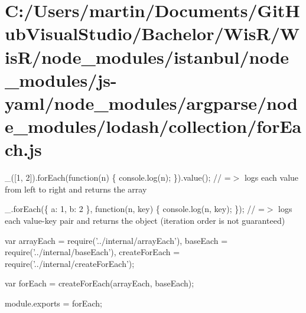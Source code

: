 \hypertarget{_c_1_2_users_2martin_2_documents_2_git_hub_visual_studio_2_bachelor_2_wis_r_2_wis_r_2node_moduleffaeb34ec877ee6de115b4c8ca4b5493}{}\section{C\+:/\+Users/martin/\+Documents/\+Git\+Hub\+Visual\+Studio/\+Bachelor/\+Wis\+R/\+Wis\+R/node\+\_\+modules/istanbul/node\+\_\+modules/js-\/yaml/node\+\_\+modules/argparse/node\+\_\+modules/lodash/collection/for\+Each.\+js}
\+\_\+(\mbox{[}1, 2\mbox{]}).for\+Each(function(n) \{ console.\+log(n); \}).value(); // =$>$ logs each value from left to right and returns the array

\+\_\+.\+for\+Each(\{ \textquotesingle{}a\textquotesingle{}\+: 1, \textquotesingle{}b\textquotesingle{}\+: 2 \}, function(n, key) \{ console.\+log(n, key); \}); // =$>$ logs each value-\/key pair and returns the object (iteration order is not guaranteed)


\begin{DoxyCodeInclude}
var arrayEach = require(\textcolor{stringliteral}{'../internal/arrayEach'}),
    baseEach = require(\textcolor{stringliteral}{'../internal/baseEach'}),
    createForEach = require(\textcolor{stringliteral}{'../internal/createForEach'});

var forEach = createForEach(arrayEach, baseEach);

module.exports = forEach;
\end{DoxyCodeInclude}
 